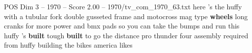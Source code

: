 \begin{textsample}{POS Dim 3 – 1970 – Score 2.00 – 1970/tv\_com\_1970\_63.txt}  \label{ex:f3_pos_040}
here 's the huffy with a tubular fork double gusseted frame and motocross mag type \textbf{wheels} long cranks for more power and bmx pads so you can take the bumps and run this huffy 's \textbf{built} tough \textbf{built} to go the distance pro thunder four assembly required from huffy building the bikes america likes

\end{textsample}
